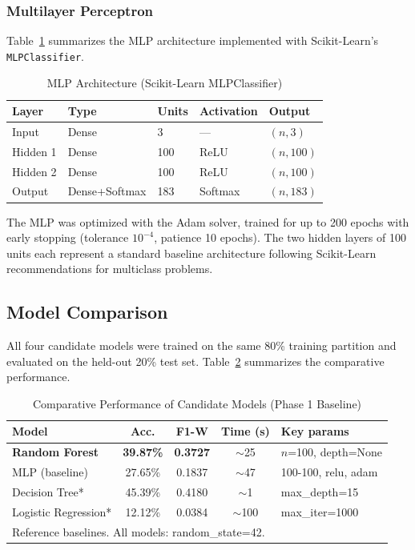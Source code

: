 \documentclass{IEEEtran}
\begin{document}
\subsubsection{Multilayer Perceptron}
Table~\ref{tab:mlp} summarizes the MLP architecture implemented with Scikit-Learn's \texttt{MLPClassifier}.

\begin{table}[htbp]
\caption{MLP Architecture (Scikit-Learn MLPClassifier)}
\label{tab:mlp}
\centering
\begin{tabular}{lllll}
\toprule
\textbf{Layer} & \textbf{Type} & \textbf{Units} & \textbf{Activation} & \textbf{Output} \\
\midrule
Input    & Dense          & 3   & ---     & $(n, 3)$   \\
Hidden 1 & Dense          & 100 & ReLU    & $(n, 100)$ \\
Hidden 2 & Dense          & 100 & ReLU    & $(n, 100)$ \\
Output   & Dense+Softmax  & 183 & Softmax & $(n, 183)$ \\
\bottomrule
\end{tabular}
\end{table}

The MLP was optimized with the Adam solver, trained for up to 200 epochs with early stopping (tolerance $10^{-4}$, patience 10 epochs). The two hidden layers of 100 units each represent a standard baseline architecture following Scikit-Learn recommendations for multiclass problems.

\subsection{Model Comparison}
All four candidate models were trained on the same 80\% training partition and evaluated on the held-out 20\% test set. Table~\ref{tab:comparison} summarizes the comparative performance.

\begin{table}[htbp]
\caption{Comparative Performance of Candidate Models (Phase 1 Baseline)}
\label{tab:comparison}
\centering
\begin{tabular}{p{2.1cm}cccp{1.8cm}}
\toprule
\textbf{Model} & \textbf{Acc.} & \textbf{F1-W} & \textbf{Time (s)} & \textbf{Key params} \\
\midrule
\textbf{Random Forest}   & \textbf{39.87\%} & \textbf{0.3727} & $\sim$25 & $n$=100, depth=None \\
MLP (baseline)           & 27.65\%          & 0.1837          & $\sim$47 & 100-100, relu, adam \\
Decision Tree*           & 45.39\%          & 0.4180          & $\sim$1  & max\_depth=15 \\
Logistic Regression*     & 12.12\%          & 0.0384          & $\sim$100 & max\_iter=1000 \\
\bottomrule
\multicolumn{5}{l}{\footnotesize *Reference baselines. All models: random\_state=42.}
\end{tabular}
\end{table}
\end{document}
